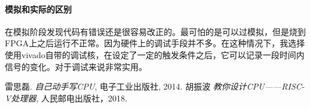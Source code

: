 \documentclass[UTF8]{ctexart}
\begin{document}
		\paragraph{模拟和实际的区别} 在模拟阶段发现代码有错误还是很容易改正的。最可怕的是可以过模拟，但是烧到FPGA上之后运行不正常。因为硬件上的调试手段并不多。在这种情况下，我选择使用vivado自带的调试核，在设定了一定的触发条件之后，它可以记录一段时间内信号的变化。对于调试来说非常实用。
		
	\begin{thebibliography}{9}
		雷思磊.
		\emph{自己动手写CPU},
		电子工业出版社, 2014.
		胡振波
		\emph{教你设计CPU——RISC-V处理器},
		人民邮电出版社，2018.
	\end{thebibliography}
	
\end{document}
